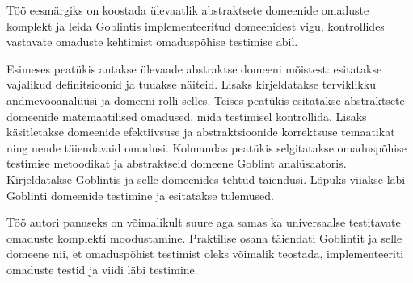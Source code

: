 \documentclass[../thesis.tex]{subfiles}
\begin{document}
Töö eesmärgiks on koostada ülevaatlik abstraktsete domeenide omaduste komplekt ja leida Goblintis implementeeritud domeenidest vigu, kontrollides vastavate omaduste kehtimist omaduspõhise testimise abil.

Esimeses peatükis antakse ülevaade abstraktse domeeni mõistest: esitatakse vajalikud definitsioonid ja tuuakse näiteid. Lisaks kirjeldatakse terviklikku andmevooanalüüsi ja domeeni rolli selles.
Teises peatükis esitatakse abstraktsete domeenide matemaatilised omadused, mida testimisel kontrollida. Lisaks käsitletakse domeenide efektiivsuse ja abstraktsioonide korrektsuse temaatikat ning nende täiendavaid omadusi.
Kolmandas peatükis selgitatakse omaduspõhise testimise metoodikat ja abstraktseid domeene Goblint analüsaatoris. Kirjeldatakse Goblintis ja selle domeenides tehtud täiendusi. Lõpuks viiakse läbi Goblinti domeenide testimine ja esitatakse tulemused.

Töö autori panuseks on võimalikult suure aga samas ka universaalse testitavate omaduste komplekti moodustamine. Praktilise osana täiendati Goblintit ja selle domeene nii, et omaduspõhist testimist oleks võimalik teostada, implementeeriti omaduste testid ja viidi läbi testimine.
\end{document}
